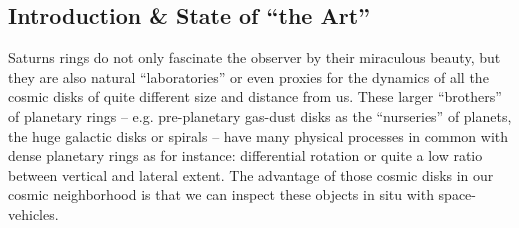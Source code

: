 \documentclass[11pt, notitlepage]{article} %
\begin{document}
\subsection*{Introduction \& State of ``the Art''}

Saturns rings do not only fascinate the observer by their miraculous beauty, but they are also natural 
``laboratories'' or even proxies for the dynamics of all the cosmic disks of quite different size and distance from us.
These larger ``brothers'' of planetary rings -- e.g. pre-planetary gas-dust disks as the ``nurseries'' of planets,
the huge galactic disks or spirals -- have many physical processes in common with dense planetary rings as
for instance:  differential rotation or quite a low ratio between vertical and lateral extent. The advantage of
those cosmic disks in our cosmic neighborhood is that we can inspect these objects in situ with space-vehicles.\\
\end{document}
